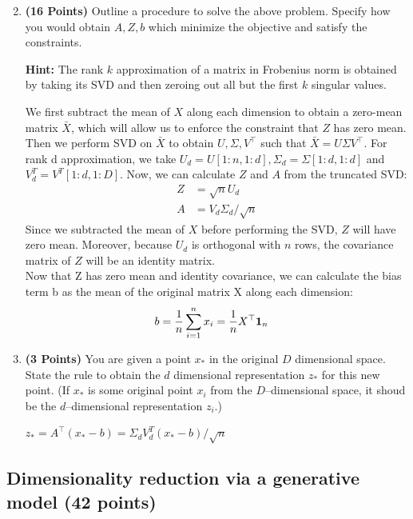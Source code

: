 \begin{enumerate}
\setcounter{enumi}{1}
\item \textbf{(16 Points)}
Outline a procedure to solve the above problem. Specify how you
would obtain $A, Z, b$ which minimize the objective and satisfy the constraints.

\textbf{Hint: }The rank $k$ approximation of a matrix in Frobenius norm is obtained by
taking its SVD and then zeroing out all but the first $k$ singular values.

\begin{soln}
  We first subtract the mean of $X$ along each dimension to obtain a zero-mean matrix $\bar{X}$, which will allow us to enforce the constraint that $Z$ has zero mean. Then we perform SVD on $\bar{X}$ to obtain $U, \Sigma, V^\top$ such that $\bar{X} = U\Sigma V^\top$. For rank d approximation, we take $U_d = U[1:n,1:d], \Sigma_d = \Sigma[1:d,1:d]$ and $V_d^T = V^T[1:d,1:D]$.
  Now, we can calculate $Z$ and $A$ from the truncated SVD:
  \begin{align*}
    Z &= \sqrt{n} U_d \\
    A &= V_d \Sigma_d / \sqrt{n}
  \end{align*}
  Since we subtracted the mean of $X$ before performing the SVD, $Z$ will have zero mean. Moreover, because $U_d$ is orthogonal with $n$ rows, the covariance matrix of $Z$ will be an identity matrix. \\
  Now that Z has zero mean and identity covariance, we can calculate the bias term b as the mean of the original matrix X along each dimension:
  \begin{align*}
    b &= \frac{1}{n} \sum_{i=1}^n x_i = \frac{1}{n} X^\top {\bf 1}_n
  \end{align*}
\end{soln}

\item \textbf{(3 Points)}
You are given a point $x_*$ in the original $D$ dimensional space.
State the rule to obtain the $d$ dimensional
representation $z_*$ for this new point.
(If $x_*$ is some original point $x_i$ from the $D$--dimensional space, it shoud be the
$d$--dimensional representation $z_i$.)

\begin{soln}
  $z_* = A^\top (x_* - b) = \Sigma_d V_d^T (x_* - b) / \sqrt{n}$
\end{soln}

\end{enumerate}


\subsection{Dimensionality reduction via a generative model (42 points)}

